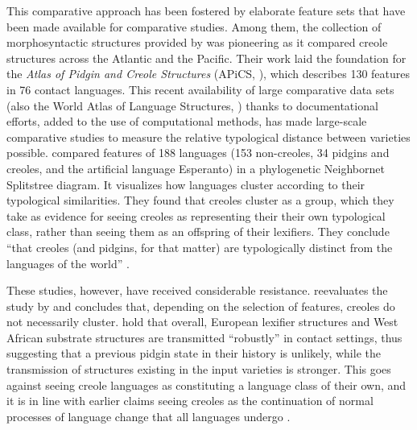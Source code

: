 \documentclass[output=paper]{langscibook}
\begin{document}
This comparative approach has been fostered by elaborate feature sets that have been made available for comparative studies. Among them, the collection of morphosyntactic structures provided by \citet{holmetal2007} was pioneering as it compared creole structures across the Atlantic and the Pacific. Their work laid the foundation for the \textit{Atlas of Pidgin and Creole Structures} (APiCS, \citealt{apics}), which describes 130 features in 76 contact languages. This recent availability of large comparative data sets (also the World Atlas of Language Structures, \citealt{wals}) thanks to documentational efforts, added to the use of computational methods, has made large-scale comparative studies to measure the relative typological distance between varieties possible. \citet{bakkeretal2013creoles} compared features of 188 languages (153 non-creoles, 34 pidgins and creoles, and the artificial language Esperanto) in a phylogenetic Neighbornet Splitstree diagram. It visualizes how languages cluster according to their typological similarities. They found that creoles cluster as a group, which they take as evidence for seeing creoles as representing their their own typological class, rather than seeing them as an offspring of their lexifiers. They conclude “that creoles (and pidgins, for that matter) are typologically distinct from the languages of the world” \citep[39]{bakkeretal2013creoles}.

These studies, however, have received considerable resistance. \citet{fonsing2017creoles} reevaluates the study by \citet{bakkeretal2013creoles} and concludes that, depending on the selection of features, creoles do not necessarily cluster. \citet{blasietal2017grammars} hold that overall, European lexifier structures and West African substrate structures are transmitted “robustly” in contact settings, thus suggesting that a previous pidgin state in their history is unlikely, while the transmission of structures existing in the input varieties is stronger. This goes against seeing creole languages as constituting a language class of their own, and it is in line with earlier claims seeing creoles as the continuation of normal processes of language change that all languages undergo \citep[e.g.][]{mufwene2008language}. 
\end{document}
